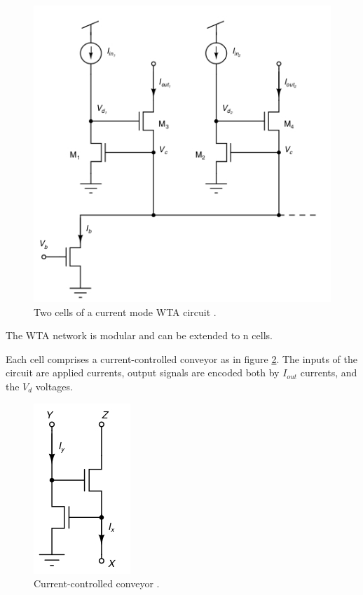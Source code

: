 \begin{figure}[htbp]
  \centering
  \includegraphics[scale=0.8]{pics/WTA.jpg}
  \caption{Two cells of a current mode WTA circuit \cite{book:VLSI}.}
  \label{fig:WTA}
\end{figure} 

The WTA network is modular and can be extended to n cells. 

Each cell comprises a current-controlled conveyor as in figure \ref{fig:current_conveyor}. The inputs of the circuit are applied currents,
output signals are encoded both by $I_{out}$ currents, and the $V_d$ voltages. 

\begin{figure}[htbp]
  \centering
  \includegraphics[scale=0.8]{pics/current_conveyor.jpg}
  \caption{Current-controlled conveyor \cite{book:VLSI}.}
  \label{fig:current_conveyor}
\end{figure} 

